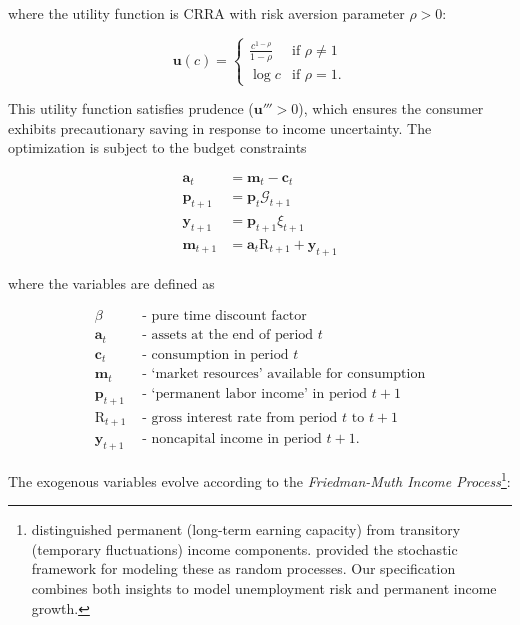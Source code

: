 \documentclass[preprint,authoryear]{elsarticle}
\newcommand{\DiscFac}{\beta}
\newcommand{\cLvl}{\mathbf{c}}
\newcommand{\uFunc}{\mathbf{u}}
\newcommand{\CRRA}{\rho}
\newcommand{\cNrm}{c}
\newcommand{\Rfree}{\text{R}}
\newcommand{\PermGroShk}{\mathcal{G}}
\newcommand{\tranShk}{\xi}
\newcommand{\aLvl}{\mathbf{a}}
\newcommand{\mLvl}{\mathbf{m}}
\newcommand{\pLvl}{\mathbf{p}}
\newcommand{\yLvl}{\mathbf{y}}
\begin{document}
where the utility function is CRRA with risk aversion parameter $\CRRA > 0$:

\begin{equation}
\label{eq:UtilityFunc}
\uFunc(\cNrm) = \begin{cases}
\frac{\cNrm^{1-\CRRA}}{1-\CRRA} & \text{if } \CRRA \neq 1 \\
\log \cNrm & \text{if } \CRRA = 1.
\end{cases}
\end{equation}

This utility function satisfies prudence ($\uFunc''' > 0$), which ensures the consumer exhibits precautionary saving in response to income uncertainty. The optimization is subject to the budget constraints

\begin{equation}
\label{eq:DBCLevel}
\begin{aligned}
\aLvl_{t}  &= \mLvl_{t}-\cLvl_{t} \\
\pLvl_{t+1}  &= \pLvl_{t} \PermGroShk_{t+1}  \\
\yLvl_{t+1}  &= \pLvl_{t+1}\tranShk_{t+1} \\
\mLvl_{t+1}  &= \aLvl_{t}\Rfree_{t+1} + \yLvl_{t+1}
\end{aligned}
\end{equation}

where the variables are defined as

\begin{equation}
\begin{aligned}
\DiscFac &\text{ - pure time discount factor} \\
\aLvl_{t} &\text{ - assets at the end of period } t \\
\cLvl_{t} &\text{ - consumption in period } t \\
\mLvl_{t} &\text{ - `market resources' available for consumption} \\
\pLvl_{t+1} &\text{ - `permanent labor income' in period } t+1 \\
\Rfree_{t+1} &\text{ - gross interest rate from period } t \text{ to } t+1 \\
\yLvl_{t+1} &\text{ - noncapital income in period } t+1.
\end{aligned}
\end{equation}

The exogenous variables evolve according to the \textit{Friedman-Muth Income Process}\footnote{\citet{Friedman1957} distinguished permanent (long-term earning capacity) from transitory (temporary fluctuations) income components. \citet{Muth1960} provided the stochastic framework for modeling these as random processes. Our specification combines both insights to model unemployment risk and permanent income growth.}:
\end{document}
